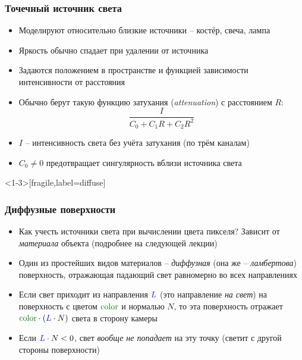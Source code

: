 \documentclass[10pt,handout]{beamer}
\begin{document}
\begin{frame}[fragile]
\frametitle{Точечный источник света}
\begin{itemize}
\item Моделируют относительно близкие источники -- костёр, свеча, лампа
\pause
\item Яркость обычно спадает при удалении от источника
\pause
\item Задаются положением в пространстве и функцией зависимости интенсивности от расстояния
\pause
\item Обычно берут такую функцию затухания (\textit{attenuation}) с расстоянием \begin{math}R\end{math}:
\begin{equation*}
\frac{I}{C_0 + C_1 R + C_2 R^2}
\end{equation*}
\pause
\pause
\item \begin{math}I\end{math} -- интенсивность света без учёта затухания (по трём каналам)
\item \begin{math}C_0\neq 0\end{math} предотвращает сингулярность вблизи источника света
\end{itemize}
\end{frame}

\begin{frame}<1-3>[fragile,label=diffuse]
\frametitle{Диффузные поверхности}
\begin{itemize}
\item Как учесть источники света при вычислении цвета пикселя? \pause Зависит от \textit{материала} объекта (подробнее на следующей лекции)
\pause
\item Один из простейших видов материалов -- \textit{диффузная} (она же -- \textit{ламбертова}) поверхность, отражающая падающий свет равномерно во всех направлениях
\pause
\item Если свет приходит из направления \begin{math}{\color{blue}L}\end{math} (это направление \textit{на свет}) на поверхность с цветом \begin{math}\color{green}\operatorname{color}\end{math} и нормалью \begin{math}N\end{math}, то эта поверхность отражает \begin{math}{\color{green}\operatorname{color}}\cdot({\color{blue}L} \cdot N)\end{math} света в сторону камеры
\pause
\item Если \begin{math}{\color{blue}L} \cdot N < 0\end{math}, свет \textit{вообще не попадает} на эту точку (светит с другой стороны поверхности)
\end{itemize}
\end{frame}
\end{document}
